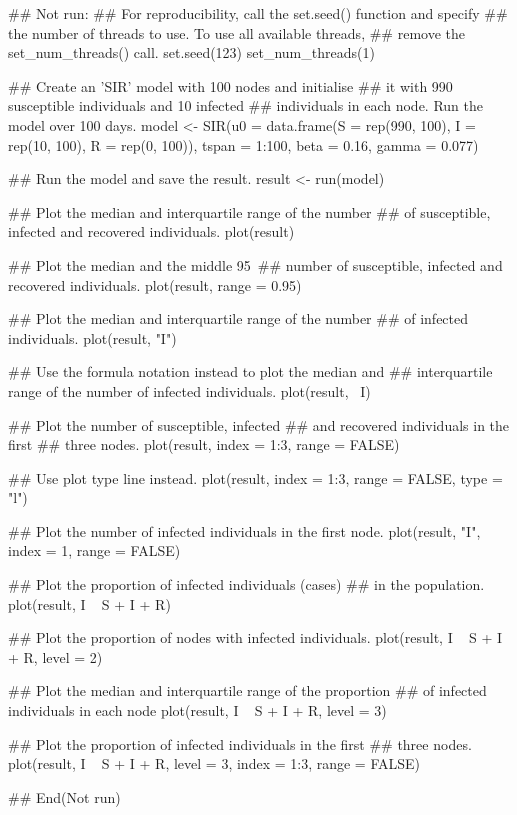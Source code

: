 \documentclass[letterpaper]{book}
\begin{document}
%
\begin{Examples}
\begin{ExampleCode}
## Not run: 
## For reproducibility, call the set.seed() function and specify
## the number of threads to use. To use all available threads,
## remove the set_num_threads() call.
set.seed(123)
set_num_threads(1)

## Create an 'SIR' model with 100 nodes and initialise
## it with 990 susceptible individuals and 10 infected
## individuals in each node. Run the model over 100 days.
model <- SIR(u0 = data.frame(S = rep(990, 100),
                             I = rep(10, 100),
                             R = rep(0, 100)),
             tspan = 1:100,
             beta = 0.16,
             gamma = 0.077)

## Run the model and save the result.
result <- run(model)

## Plot the median and interquartile range of the number
## of susceptible, infected and recovered individuals.
plot(result)

## Plot the median and the middle 95\
## number of susceptible, infected and recovered individuals.
plot(result, range = 0.95)

## Plot the median and interquartile range of the  number
## of infected individuals.
plot(result, "I")

## Use the formula notation instead to plot the median and
## interquartile range of the number of infected individuals.
plot(result, ~I)

## Plot the number of susceptible, infected
## and recovered individuals in the first
## three nodes.
plot(result, index = 1:3, range = FALSE)

## Use plot type line instead.
plot(result, index = 1:3, range = FALSE, type = "l")

## Plot the number of infected individuals in the first node.
plot(result, "I", index = 1, range = FALSE)

## Plot the proportion of infected individuals (cases)
## in the population.
plot(result, I ~ S + I + R)

## Plot the proportion of nodes with infected individuals.
plot(result, I ~ S + I + R, level = 2)

## Plot the median and interquartile range of the proportion
## of infected individuals in each node
plot(result, I ~ S + I + R, level = 3)

## Plot the proportion of infected individuals in the first
## three nodes.
plot(result, I ~ S + I + R, level = 3, index = 1:3, range = FALSE)

## End(Not run)
\end{ExampleCode}
\end{Examples}
\end{document}
